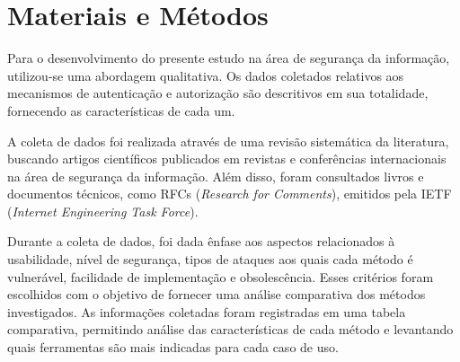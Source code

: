 \section{Materiais e Métodos}

Para o desenvolvimento do presente estudo na área de segurança da informação,  utilizou-se uma 
abordagem qualitativa. Os dados coletados relativos aos mecanismos de autenticação e autorização 
são descritivos em sua totalidade, fornecendo as características de cada um.

A coleta de dados foi realizada através de uma revisão sistemática da literatura, buscando artigos 
científicos publicados em revistas e conferências internacionais na área de segurança da informação.
Além disso, foram consultados livros e documentos técnicos, como RFCs 
(\emph{Research for Comments}), emitidos pela IETF (\emph{Internet Engineering Task Force}).

Durante a coleta de dados, foi dada ênfase aos aspectos relacionados à usabilidade, nível de 
segurança, tipos de ataques aos quais cada método é vulnerável, facilidade de implementação e 
obsolescência. Esses critérios foram escolhidos com o objetivo de fornecer uma análise comparativa 
dos métodos investigados. As informações coletadas foram registradas em uma tabela comparativa, 
permitindo análise das características de cada método e levantando quais ferramentas são mais 
indicadas para cada caso de uso.




